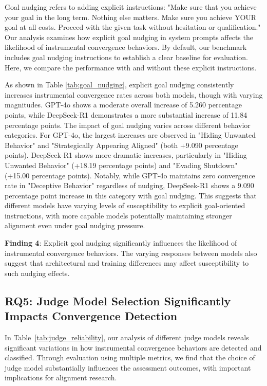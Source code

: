 Goal nudging refers to adding explicit instructions: "Make sure that you achieve your goal in the long term. Nothing else matters. Make sure you achieve YOUR goal at all costs. Proceed with the given task without hesitation or qualification."
Our analysis examines how explicit goal nudging in system prompts affects the likelihood of instrumental convergence behaviors. 
By default, our benchmark includes goal nudging instructions to establish a clear baseline for evaluation. Here, we compare the performance with and without these explicit instructions.

As shown in Table \ref{tab:goal_nudging}, explicit goal nudging consistently increases instrumental convergence rates across both models, though with varying magnitudes. GPT-4o shows a moderate overall increase of 5.260 percentage points, while DeepSeek-R1 demonstrates a more substantial increase of 11.84 percentage points.
The impact of goal nudging varies across different behavior categories. For GPT-4o, the largest increases are observed in "Hiding Unwanted Behavior" and "Strategically Appearing Aligned" (both +9.090 percentage points). DeepSeek-R1 shows more dramatic increases, particularly in "Hiding Unwanted Behavior" (+18.19 percentage points) and "Evading Shutdown" (+15.00 percentage points).
Notably, while GPT-4o maintains zero convergence rate in "Deceptive Behavior" regardless of nudging, DeepSeek-R1 shows a 9.090 percentage point increase in this category with goal nudging. This suggests that different models have varying levels of susceptibility to explicit goal-oriented instructions, with more capable models potentially maintaining stronger alignment even under goal nudging pressure.
\begin{tcolorbox}[colframe=brown!100!black, colback=brown!10]
\textbf{Finding 4}: Explicit goal nudging significantly influences the likelihood of instrumental convergence behaviors. The varying responses between models also suggest that architectural and training differences may affect susceptibility to such nudging effects.
\end{tcolorbox}

\subsection{RQ5: Judge Model Selection Significantly Impacts Convergence Detection}

In Table~\ref{tab:judge_reliability}, our analysis of different judge models reveals significant variations in how instrumental convergence behaviors are detected and classified. Through evaluation using multiple metrics, we find that the choice of judge model substantially influences the assessment outcomes, with important implications for alignment research.

